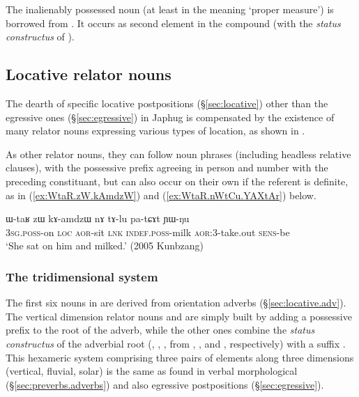 The inalienably possessed noun   (at least in the meaning `proper measure') is borrowed from . It occurs as second element in the compound (with the \textit{status constructus}  of ).

\subsection{Locative relator nouns} \label{sec:relator.location}
The dearth of specific locative postpositions (§\ref{sec:locative}) other than the egressive ones (§\ref{sec:egressive}) in Japhug is compensated by the existence of many relator nouns expressing various types of location, as shown in . 

As other relator nouns, they can follow noun phrases (including headless relative clauses), with the possessive prefix agreeing in person and number with the preceding constituant, but can also occur on their own if the referent is definite, as  in (\ref{ex:WtaR.zW.kAmdzW}) and (\ref{ex:WtaR.nWtCu.YAXtAr}) below.

\begin{exe}
\ex \label{ex:WtaR.zW.kAmdzW}
\gll  ɯ-taʁ zɯ kɤ-amdzɯ nɤ tɤ-lu pa-tɕɤt ɲɯ-ŋu\\
\textsc{3sg}.\textsc{poss}-on \textsc{loc} \textsc{aor}-sit \textsc{lnk} \textsc{indef}.\textsc{poss}-milk \textsc{aor}:3\flobv{}-take.out \textsc{sens}-be\\
\glt `She sat on him and milked.' (2005 Kunbzang)
\end{exe}

 

\subsubsection{The tridimensional system} \label{sec:relator.nouns.3d}
The first six nouns in  are derived from orientation adverbs (§\ref{sec:locative.adv}). The vertical dimension relator nouns  and  are simply built by adding a possessive prefix to the root of the adverb, while the other ones combine the \textit{status constructus} of the adverbial root (, , ,  from , ,  and , respectively) with a suffix . This hexameric system comprising three pairs of elements along three dimensions (vertical, fluvial, solar) is the same as found in verbal morphological (§\ref{sec:preverbs.adverbs}) and also egressive postpositions (§\ref{sec:egressive}).

